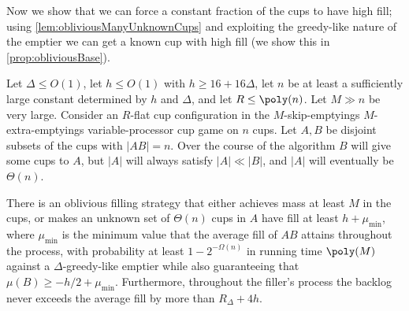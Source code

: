 Now we show that we can force a constant fraction of the cups to
have high fill; using \cref{lem:obliviousManyUnknownCups} and
exploiting the greedy-like nature of the emptier we can get a
known cup with high fill (we show this in
\cref{prop:obliviousBase}).
\begin{lemma}
  \label{lem:obliviousManyUnknownCups}
  Let $\Delta \le O(1)$, let $h \le O(1)$ with $h \ge
  16+16\Delta$, let $n$ be at least a sufficiently large constant
  determined by $h$ and $\Delta$, and let $R \le \poly(n)$.
  Let $M\gg n$ be very large.
  Consider an $R$-flat cup configuration in the
  $M$-skip-emptyings $M$-extra-emptyings
  variable-processor cup game on $n$ cups.
  Let $A, B$ be disjoint subsets of the cups with $|AB| = n$.
  Over the course of the algorithm $B$ will give some cups to
  $A$, but $|A|$ will always satisfy $|A| \ll |B|$, and $|A|$
  will eventually be $\Theta(n)$.

  There is an oblivious filling strategy that either achieves
  mass at least $M$ in the cups, or makes an unknown
  set of $\Theta(n)$ cups in $A$ have fill at least $h +
  \mu_{\min}$, where $\mu_{\min}$ is the minimum value that the
  average fill of $AB$ attains throughout the process, with
  probability at least $1-2^{-\Omega(n)}$ in running time
  $\poly(M)$ against a $\Delta$-greedy-like emptier while also
  guaranteeing that $\mu(B) \ge -h/2 + \mu_{\min}$. Furthermore, throughout
  the filler's process the backlog never exceeds the average
  fill by more than $R_\Delta + 4h$.
\end{lemma}
